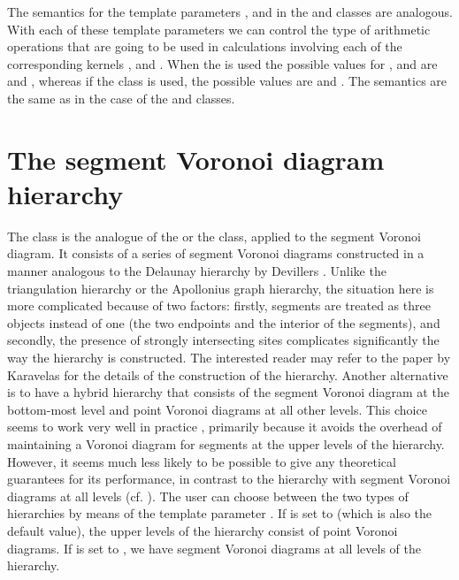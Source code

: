 The semantics for the template parameters ,  and
 in the
 and 
classes are analogous. With each of these template parameters we can
control the type of arithmetic operations that are going to be used in
calculations involving each of the corresponding kernels ,
 and . When the
 is
used the possible values for ,  and  are
 and , whereas if the 
class is used, the possible values are  and
. The semantics are the same as in the case of the 
 and 
 classes.






\section{The segment Voronoi diagram hierarchy}
\label{sec:segvor2-hierarchy}


The
class is the analogue of the
 or the 
class, applied to the segment Voronoi diagram. It consists of a series of
segment Voronoi diagrams constructed in a manner analogous to the
Delaunay hierarchy by Devillers \cite{cgal:d-dh-02}. Unlike the
triangulation hierarchy or the Apollonius graph hierarchy, the
situation here is more complicated because of two factors: firstly,
segments are treated as three objects instead of one (the two
endpoints and the interior of the segments), and secondly, the
presence of strongly intersecting sites complicates significantly the
way the hierarchy is constructed. The interested reader may refer to
the paper by Karavelas \cite{k-reisv-04} for the details of the
construction of the hierarchy.
Another alternative is to have a hybrid hierarchy that consists of the
segment Voronoi diagram at the bottom-most level and point Voronoi
diagrams at all other levels. This choice seems to work very well in
practice , primarily because it avoids the overhead of maintaining a
Voronoi diagram for segments at the upper levels of the
hierarchy. However, it seems much less likely to be possible to give
any theoretical guarantees for its performance, in contrast to the
hierarchy with segment Voronoi diagrams at all levels
(cf. \cite{k-reisv-04}). The user can choose between the two types of
hierarchies by means of the template parameter . If
 is set to  (which is also the default value),
the upper levels of the hierarchy consist of point Voronoi
diagrams. If  is set to , we have segment Voronoi
diagrams at all levels of the hierarchy.

